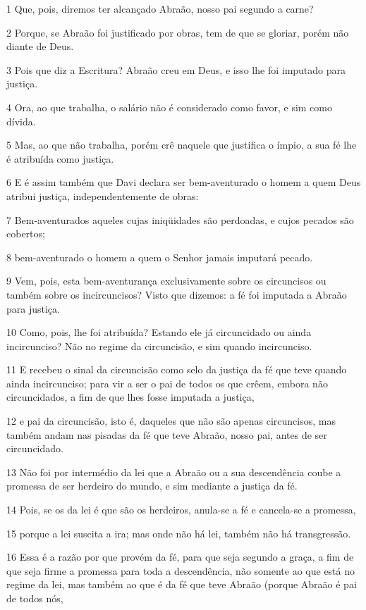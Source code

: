 \par 1 Que, pois, diremos ter alcançado Abraão, nosso pai segundo a carne?
\par 2 Porque, se Abraão foi justificado por obras, tem de que se gloriar, porém não diante de Deus.
\par 3 Pois que diz a Escritura? Abraão creu em Deus, e isso lhe foi imputado para justiça.
\par 4 Ora, ao que trabalha, o salário não é considerado como favor, e sim como dívida.
\par 5 Mas, ao que não trabalha, porém crê naquele que justifica o ímpio, a sua fé lhe é atribuída como justiça.
\par 6 E é assim também que Davi declara ser bem-aventurado o homem a quem Deus atribui justiça, independentemente de obras:
\par 7 Bem-aventurados aqueles cujas iniqüidades são perdoadas, e cujos pecados são cobertos;
\par 8 bem-aventurado o homem a quem o Senhor jamais imputará pecado.
\par 9 Vem, pois, esta bem-aventurança exclusivamente sobre os circuncisos ou também sobre os incircuncisos? Visto que dizemos: a fé foi imputada a Abraão para justiça.
\par 10 Como, pois, lhe foi atribuída? Estando ele já circuncidado ou ainda incircunciso? Não no regime da circuncisão, e sim quando incircunciso.
\par 11 E recebeu o sinal da circuncisão como selo da justiça da fé que teve quando ainda incircunciso; para vir a ser o pai de todos os que crêem, embora não circuncidados, a fim de que lhes fosse imputada a justiça,
\par 12 e pai da circuncisão, isto é, daqueles que não são apenas circuncisos, mas também andam nas pisadas da fé que teve Abraão, nosso pai, antes de ser circuncidado.
\par 13 Não foi por intermédio da lei que a Abraão ou a sua descendência coube a promessa de ser herdeiro do mundo, e sim mediante a justiça da fé.
\par 14 Pois, se os da lei é que são os herdeiros, anula-se a fé e cancela-se a promessa,
\par 15 porque a lei suscita a ira; mas onde não há lei, também não há transgressão.
\par 16 Essa é a razão por que provém da fé, para que seja segundo a graça, a fim de que seja firme a promessa para toda a descendência, não somente ao que está no regime da lei, mas também ao que é da fé que teve Abraão (porque Abraão é pai de todos nós,
